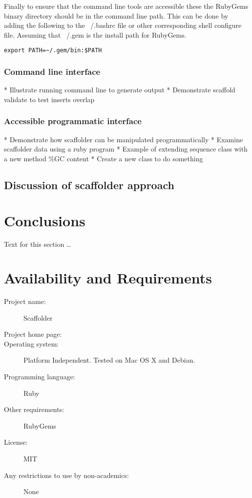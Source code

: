 \documentclass[10pt]{bmc_article}
\newenvironment{bmcformat}{\begin{raggedright}\baselineskip20pt\sloppy\setboolean{publ}{false}}{\end{raggedright}\baselineskip20pt\sloppy}
\begin{document}
\begin{bmcformat}
Finally to ensure that the command line tools are accessible these the
RubyGems binary directory should be in the command line path. This can be done
by adding the following to the ~/.bashrc file or other corresponding shell
configure file. Assuming that ~/.gem is the install path for RubyGems.

\begin{verbatim}
export PATH=~/.gem/bin:$PATH
\end{verbatim}

\subsubsection*{Command line interface} %

  * Illustrate running command line to generate output
  * Demonstrate scaffold validate to test inserts overlap

\subsubsection*{Accessible programmatic interface} %

  * Demonstrate how scaffolder can be manipulated programmatically
  * Examine scaffolder data using a ruby program
  * Example of extending sequence class with a new method \%GC content
  * Create a new class to do something

\subsection*{Discussion of scaffolder approach} %

\section*{Conclusions} %

Text for this section \ldots

\section*{Availability and Requirements}

  \begin{description}
    \item[Project name:] Scaffolder
    \item[Project home page:] \scaffolder
    \item[Operating system:] Platform Independent. Tested on Mac OS X and
    Debian.
    \item[Programming language:] Ruby
    \item[Other requirements:] RubyGems
    \item[License:] MIT
    \item[Any restrictions to use by non-academics:] None
  \end{description}


\end{bmcformat}
\end{document}
